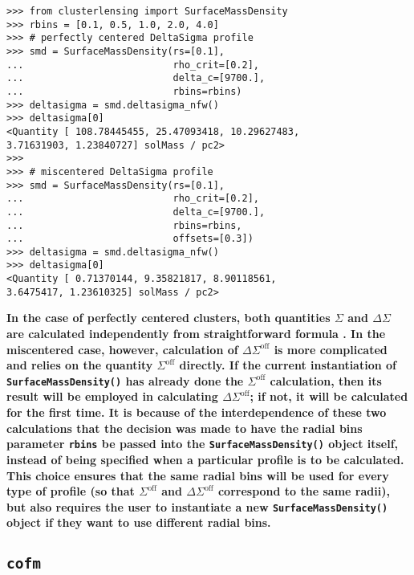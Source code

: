 \documentclass[twocolumn]{aastex6}
\newcommand{\code}{\lstinline[style=codeintext]}
\newcommand{\hcode}{\large\normalfont\texttt} %
\begin{document}
\begin{verbatim}
>>> from clusterlensing import SurfaceMassDensity
>>> rbins = [0.1, 0.5, 1.0, 2.0, 4.0]
>>> # perfectly centered DeltaSigma profile
>>> smd = SurfaceMassDensity(rs=[0.1],
...                          rho_crit=[0.2],
...                          delta_c=[9700.],
...                          rbins=rbins)
>>> deltasigma = smd.deltasigma_nfw()
>>> deltasigma[0]
<Quantity [ 108.78445455, 25.47093418, 10.29627483,
3.71631903, 1.23840727] solMass / pc2>
>>> 
>>> # miscentered DeltaSigma profile
>>> smd = SurfaceMassDensity(rs=[0.1],
...                          rho_crit=[0.2],
...                          delta_c=[9700.],
...                          rbins=rbins,
...                          offsets=[0.3])
>>> deltasigma = smd.deltasigma_nfw()
>>> deltasigma[0]
<Quantity [ 0.71370144, 9.35821817, 8.90118561,
3.6475417, 1.23610325] solMass / pc2>
\end{verbatim}

{\bf In the case of perfectly centered clusters, both quantities $\Sigma$ and $\Delta\Sigma$ are calculated independently from straightforward formula \citep{Wright00}. In the miscentered case, however, calculation of $\Delta\Sigma^\mathrm{off}$ is more complicated and relies on the quantity $\Sigma^\mathrm{off}$ directly. If the current instantiation of \code{SurfaceMassDensity()} has already done the $\Sigma^\mathrm{off}$ calculation, then its result will be employed in calculating $\Delta\Sigma^\mathrm{off}$; if not, it will be calculated for the first time. It is because of the interdependence of these two calculations that the decision was made to have the radial bins parameter \code{rbins} be passed into the \code{SurfaceMassDensity()} object itself, instead of being specified when a particular profile is to be calculated. This choice ensures that the same radial bins will be used for every type of profile (so that $\Sigma^\mathrm{off}$ and $\Delta\Sigma^\mathrm{off}$ correspond to the same radii), but also requires the user to instantiate a new \code{SurfaceMassDensity()} object if they want to use different radial bins.}


\subsection{\hcode{cofm}}
\label{cofm}
\end{document}
